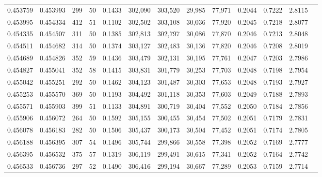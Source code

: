 \begin{tabular}{rrrrrrrrrrrrr}
0.453759 & 0.453993 &   299 &  50 &                                     0.1433 & 302,090 & 303,520 &  29,985 &  77,971 & 0.2044 & 0.7222 & 2.8115 \\
0.453995 & 0.454334 &   412 &  51 &                                     0.1102 & 302,502 & 303,108 &  30,036 &  77,920 & 0.2045 & 0.7218 & 2.8077 \\
0.454335 & 0.454507 &   311 &  50 &                                     0.1385 & 302,813 & 302,797 &  30,086 &  77,870 & 0.2046 & 0.7213 & 2.8048 \\
0.454511 & 0.454682 &   314 &  50 &                                     0.1374 & 303,127 & 302,483 &  30,136 &  77,820 & 0.2046 & 0.7208 & 2.8019 \\
0.454689 & 0.454826 &   352 &  59 &                                     0.1436 & 303,479 & 302,131 &  30,195 &  77,761 & 0.2047 & 0.7203 & 2.7986 \\
0.454827 & 0.455041 &   352 &  58 &                                     0.1415 & 303,831 & 301,779 &  30,253 &  77,703 & 0.2048 & 0.7198 & 2.7954 \\
0.455042 & 0.455251 &   292 &  50 &                                     0.1462 & 304,123 & 301,487 &  30,303 &  77,653 & 0.2048 & 0.7193 & 2.7927 \\
0.455253 & 0.455570 &   369 &  50 &                                     0.1193 & 304,492 & 301,118 &  30,353 &  77,603 & 0.2049 & 0.7188 & 2.7893 \\
0.455571 & 0.455903 &   399 &  51 &                                     0.1133 & 304,891 & 300,719 &  30,404 &  77,552 & 0.2050 & 0.7184 & 2.7856 \\
0.455906 & 0.456072 &   264 &  50 &                                     0.1592 & 305,155 & 300,455 &  30,454 &  77,502 & 0.2051 & 0.7179 & 2.7831 \\
0.456078 & 0.456183 &   282 &  50 &                                     0.1506 & 305,437 & 300,173 &  30,504 &  77,452 & 0.2051 & 0.7174 & 2.7805 \\
0.456188 & 0.456395 &   307 &  54 &                                     0.1496 & 305,744 & 299,866 &  30,558 &  77,398 & 0.2052 & 0.7169 & 2.7777 \\
0.456395 & 0.456532 &   375 &  57 &                                     0.1319 & 306,119 & 299,491 &  30,615 &  77,341 & 0.2052 & 0.7164 & 2.7742 \\
0.456533 & 0.456736 &   297 &  52 &                                     0.1490 & 306,416 & 299,194 &  30,667 &  77,289 & 0.2053 & 0.7159 & 2.7714 \\

\end{tabular}
